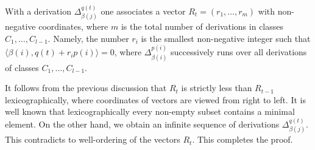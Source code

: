 \documentclass[a4paper, 12pt,oneside,reqno]{amsart}
\numberwithin{equation}{section}
\theoremstyle{definition}
\begin{document}
With a derivation $\Delta^{q(t)}_{\beta(j)}$ one associates a vector $R_t=(r_1,\ldots,r_m)$ with non-negative coordinates, where $m$ is the total number of derivations in classes $C_1,\ldots, C_{l-1}.$ Namely, the number $r_i$ is the smallest non-negative integer such that $\langle\beta(i),q(t)+r_ip(i)\rangle=0$, where $\Delta^{p(i)}_{\beta(i)}$ successively runs over all derivations of classes $C_1,\ldots, C_{l-1}.$

It follows from the previous discussion that $R_t$ is strictly less than $R_{t-1}$ lexicographically, where coordinates of vectors are viewed from right to left. It is well known that lexicographically every non-empty subset contains a minimal element. On the other hand, we obtain an infinite sequence of derivations $\Delta^{q(t)}_{\beta(j)}$. This contradicts to well-ordering of the vectors $R_t$. This completes the proof.
\end{document}
